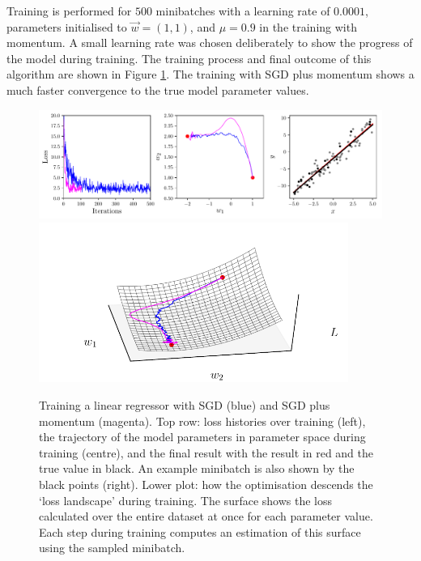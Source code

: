 Training is performed for $500$ minibatches with a learning rate of $0.0001$, parameters initialised to $\vec{w}=(1,1)$, and $\mu=0.9$ in the training with momentum. 
A small learning rate was chosen deliberately to show the progress of the model during training. 
The training process and final outcome of this algorithm are shown in Figure \ref{fig:machine_learning:lin_example}.
The training with SGD plus momentum shows a much faster convergence to the true model parameter values.
\begin{figure}[h!]
    \begin{center}
        \includegraphics[width=1.0\textwidth]{figures/machine_learning/ML_figure_1.pdf}
        \includegraphics[width=0.9\textwidth]{figures/machine_learning/ML_figure_1_3Dloss.pdf}
    \end{center}
    \caption{Training a linear regressor with SGD (blue) and SGD plus momentum (magenta). Top row: loss histories over training (left), the trajectory of the model parameters in parameter space during training (centre), and the final result with the result in red and the true value in black. An example minibatch is also shown by the black points (right).
            Lower plot: how the optimisation descends the `loss landscape' during training. The surface shows the loss calculated over the entire dataset at once for each parameter value. Each step during training computes an estimation of this surface using the sampled minibatch.}
        \label{fig:machine_learning:lin_example}
\end{figure}




